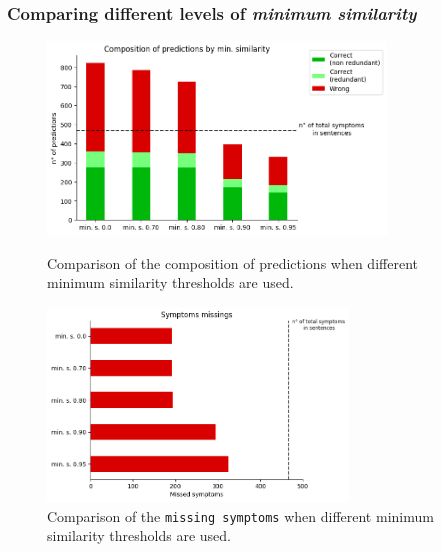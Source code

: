 \subsubsection{Comparing different levels of \textit{minimum similarity}}
\begin{figure}[h]%
  \centering
  \begin{minipage}[b]{0.4\textwidth}
    \includegraphics[width=9cm]{graphs/comparison_min_similarity}
    \caption{Comparison of the composition of predictions when different minimum similarity thresholds are used.}
  \end{minipage}
  \hfill
  \begin{minipage}[b]{0.4\textwidth}
    \includegraphics[width=8cm]{graphs/comparison_min_similarity_missings}
    \caption{Comparison of the \texttt{missing symptoms} when different minimum similarity thresholds are used.}
  \end{minipage}
\end{figure}

